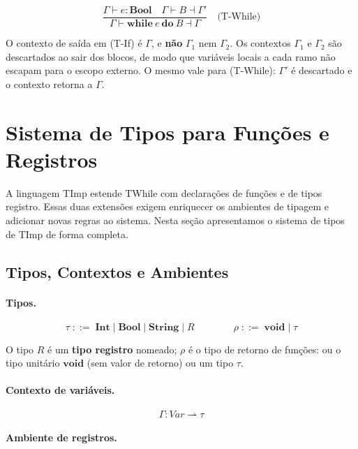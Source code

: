 \[
  \frac{\Gamma \vdash e : \mathbf{Bool}
  \quad \Gamma \vdash B \dashv \Gamma'}
  {\Gamma \vdash \mathbf{while}\ e\ \mathbf{do}\ B \dashv \Gamma}
  \quad\text{(T-While)}
\]

O contexto de saída em (T-If) é \(\Gamma\), e \textbf{não}
\(\Gamma_1\) nem \(\Gamma_2\). Os contextos \(\Gamma_1\) e \(\Gamma_2\)
são descartados ao sair dos blocos, de modo que variáveis locais a
cada ramo não escapam para o escopo externo. O mesmo vale para
(T-While): \(\Gamma'\) é descartado e o contexto retorna a \(\Gamma\).

\section{Sistema de Tipos para Funções e Registros}

A linguagem TImp estende TWhile com declarações de funções e de tipos
registro. Essas duas extensões exigem enriquecer os ambientes de
tipagem e adicionar novas regras ao sistema. Nesta seção
apresentamos o sistema de tipos de TImp de forma completa.

\subsection{Tipos, Contextos e Ambientes}

\paragraph{Tipos.}

\[
  \tau \;::=\; \mathbf{Int} \mid \mathbf{Bool} \mid \mathbf{String}
               \mid R
  \qquad\qquad
  \rho \;::=\; \mathbf{void} \mid \tau
\]

O tipo \(R\) é um \textbf{tipo registro} nomeado; \(\rho\) é o tipo de
retorno de funções: ou o tipo unitário \(\mathbf{void}\) (sem valor
de retorno) ou um tipo \(\tau\).

\paragraph{Contexto de variáveis.}

\[
  \Gamma : \mathit{Var} \rightharpoonup \tau
\]

\paragraph{Ambiente de registros.}

